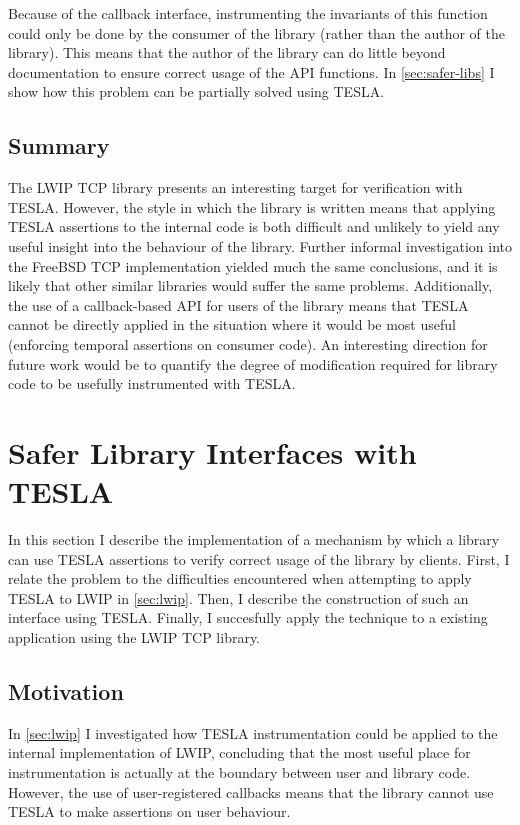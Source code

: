 Because of the callback interface, instrumenting the invariants of this
function could only be done by the consumer of the library (rather than
the author of the library). This means that the author of the library
can do little beyond documentation to ensure correct usage of the API
functions. In \autoref{sec:safer-libs} I show how this problem can be partially
solved using TESLA.

\subsection{Summary}

The LWIP TCP library presents an interesting target for verification with TESLA.
However, the style in which the library is written means that applying TESLA
assertions to the internal code is both difficult and unlikely to yield any
useful insight into the behaviour of the library. Further informal investigation
into the FreeBSD TCP implementation yielded much the same conclusions, and it is
likely that other similar libraries would suffer the same problems.
Additionally, the use of a callback-based API for users of the library means
that TESLA cannot be directly applied in the situation where it would be most
useful (enforcing temporal assertions on consumer code). An interesting
direction for future work would be to quantify the degree of modification
required for library code to be usefully instrumented with TESLA.

\section{Safer Library Interfaces with TESLA} \label{sec:safer-libs}

In this section I describe the implementation of a mechanism by which a library
can use TESLA assertions to verify correct usage of the library by clients.
First, I relate the problem to the difficulties encountered when attempting to
apply TESLA to LWIP in \autoref{sec:lwip}. Then, I describe the construction of
such an interface using TESLA. Finally, I succesfully apply the technique to a
existing application using the LWIP TCP library.

\subsection{Motivation}

In \autoref{sec:lwip} I investigated how TESLA instrumentation could be applied
to the internal implementation of LWIP, concluding that the most useful place
for instrumentation is actually at the boundary between user and library code.
However, the use of user-registered callbacks means that the library cannot use
TESLA to make assertions on user behaviour.

